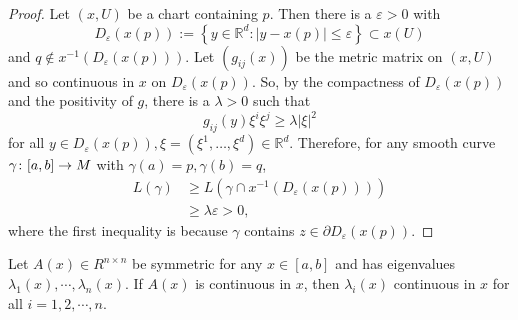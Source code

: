 \begin{enumerate}[label=\arabic{*}.]
\begin{proof}
		\noindent Let $(x,U)$ be a chart containing $p$. Then there is a $\varepsilon > 0$ with
		\begin{equation*}
			D_{\varepsilon}(x(p)):=\left\{y \in \mathbb{R}^d:|y-x(p)| \leq \varepsilon\right\} \subset x(U)
		\end{equation*}
		and $q \notin x^{-1}\left(D_{\varepsilon}(x(p))\right)$. Let $\left(g_{i j}(x)\right)$ be the metric matrix on $(x,U)$ and so continuous in $x$ on $D_{\varepsilon}(x(p))$. So, by the compactness of $D_{\varepsilon}(x(p))$ and the positivity of $g$, there is a $\lambda > 0$ such that
		\begin{equation*}
			g_{i j}(y) \xi^i \xi^j \geq \lambda|\xi|^2
		\end{equation*}
		for all $y \in D_{\varepsilon}(x(p)), \xi=\left(\xi^1, \ldots, \xi^d\right) \in \mathbb{R}^d$. Therefore, for any smooth curve $\gamma \colon [a,b] \rightarrow M$ with $\gamma(a)=p, \gamma(b)=q$,
		\begin{equation*}
			\begin{aligned}
				L(\gamma) & \geq L\left(\gamma \cap x^{-1}\left(D_{\varepsilon}(x(p))\right)\right) \\
				& \geq \lambda \varepsilon>0,
			\end{aligned}
		\end{equation*}
		where the first inequality is because $\gamma$ contains $z \in \partial D_{\varepsilon}(x(p))$.
	\end{proof}
	\begin{rmk}
	 	Let $A(x) \in R^{n\times n}$ be symmetric for any $x \in [a,b]$ and has eigenvalues $\lambda_1(x),\cdots,\lambda_n(x)$. If $A(x)$ is continuous in $x$, then $\lambda_i(x)$ continuous in $x$ for all $i = 1,2,\cdots,n$.
	\end{rmk} 


\end{enumerate}
